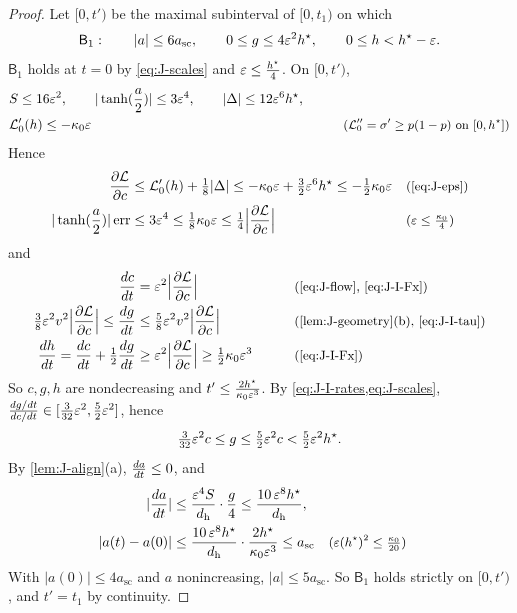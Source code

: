 \begin{proof}
Let $[0,t')$ be the maximal subinterval of $[0,t_1)$ on which
\[
 \mathsf B_1:\qquad |a|\le6a_{\mathrm{sc}},\qquad 0\le g\le4\varepsilon^2 h^\star,\qquad 0\le h< h^\star-\varepsilon .
\]
$\mathsf B_1$ holds at $t=0$ by \cref{eq:J-scales} and $\varepsilon\le\frac{h^\star}{4}$. On $[0,t')$,
\begin{alignat*}{2}
 &S\le16\varepsilon^2,\qquad |\tanh(\frac{a}{2})|\le3\varepsilon^4,\qquad |\Delta|\le12\varepsilon^6 h^\star, &\qquad& \\
 &\mathcal L_0'(h)\le-\kappa_0\varepsilon && \text{\small($\mathcal L_0''=\sigma'\ge p(1-p)$ on $[0,h^\star]$)}
\end{alignat*}
Hence
\begin{align}
  \pd{\mathcal L}{c}&\le \mathcal L_0'( h)+\tfrac{1}{8}|\Delta|\le-\kappa_0\initscale+\tfrac{3}{2}\initscale^6 h^\star\le-\tfrac{1}{2}\kappa_0\initscale && \why{\cref{eq:J-eps}}\label{eq:J-I-Fx}\\
 |\tanh(\frac{a}{2})|\,\mathrm{err}&\le3\initscale^4\le\tfrac{1}{8}\kappa_0\initscale\le\tfrac{1}{4}\Bigl|\pd{\mathcal L}{c}\Bigr| && \why{$\initscale\le\tfrac{\kappa_0}{4}$}\label{eq:J-I-tau}
\end{align}
and
\begin{alignat}{2}
 \ddt{c}&=\initscale^2\Bigl|\pd{\mathcal L}{c}\Bigr| &\qquad& \why{\cref{eq:J-flow}, \cref{eq:J-I-Fx}}\nonumber\\
 \tfrac{3}{8}\initscale^2v^2\Bigl|\pd{\mathcal L}{c}\Bigr|\le\ddt{g}&\le\tfrac{5}{8}\initscale^2v^2\Bigl|\pd{\mathcal L}{c}\Bigr| && \why{\cref{lem:J-geometry}(b), \cref{eq:J-I-tau}}\label{eq:J-I-rates}\\
 \ddt{h}=\ddt{c}+\tfrac{1}{2}\ddt{g}&\ge\initscale^2\Bigl|\pd{\mathcal L}{c}\Bigr|\ge\tfrac{1}{2}\kappa_0\initscale^3 && \why{\cref{eq:J-I-Fx}}\nonumber
\end{alignat}
So $c,g, h$ are nondecreasing and $t'\le\frac{2 h^\star}{\kappa_0\varepsilon^3}$. By \cref{eq:J-I-rates,eq:J-scales}, $\frac{\ddt{g}}{\ddt{c}}\in[\frac{3}{32}\initscale^2,\frac{5}{2}\initscale^2]$, hence
\begin{equation}
 \tfrac{3}{32}\varepsilon^2c\le g\le\tfrac{5}{2}\varepsilon^2c<\tfrac{5}{2}\varepsilon^2 h^\star .
 \label{eq:J-I-g}
\end{equation}
By \cref{lem:J-align}(a), $\ddt{a}\le0$, and
\begin{align*}
 |\ddt{a}|&\le\frac{\initscale^4S}{d_{\mathrm h}}\cdot\frac{g}{4}\le\frac{10\,\initscale^8 h^\star}{d_{\mathrm h}},\\
 |a(t)-a(0)|&\le\frac{10\,\initscale^8 h^\star}{d_{\mathrm h}}\cdot\frac{2 h^\star}{\kappa_0\initscale^3}\le a_{\mathrm{sc}} && \why{$\initscale(h^\star)^2\le\tfrac{\kappa_0}{20}$}
\end{align*}
With $|a(0)|\le4a_{\mathrm{sc}}$ and $a$ nonincreasing, $|a|\le5a_{\mathrm{sc}}$. So $\mathsf B_1$ holds strictly on $[0,t')$, and $t'=t_1$ by continuity.


\end{proof}
